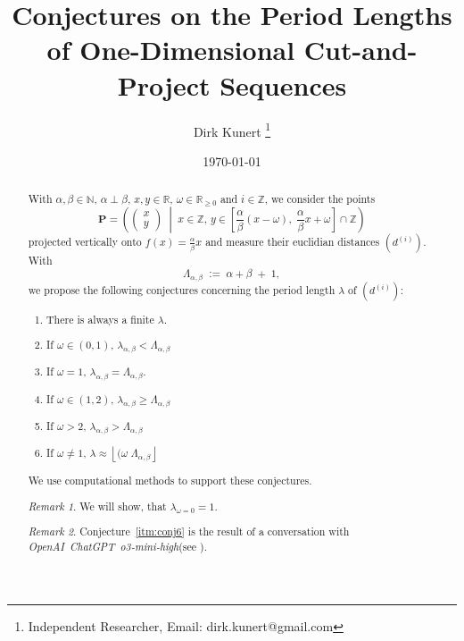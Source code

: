 \documentclass[11pt]{article}
\title{Conjectures on the Period Lengths of One-Dimensional Cut-and-Project Sequences}
\author{Dirk Kunert \thanks{Independent Researcher, Email: dirk.kunert@gmail.com}}
\date{\today}
\theoremstyle{remark}
\newtheorem{remark}{Remark}
\begin{document}
%
\newcommand{\showfigures}{true}
\newcommand{\todo}[1]{\textcolor{red}{TODO: {#1}}}
\newcommand{\langc}[0]{\mbox{C}\xspace}
\newcommand{\langp}[0]{\mbox{Python}\xspace}
\newcommand{\chat}[0]{\mbox{\emph{OpenAI ChatGPT o3-mini-high}}\xspace}
\newcommand{\function}[1]{\mbox{\texttt{#1}}\xspace}

\maketitle
%
\begin{abstract}
With $\alpha, \beta \in \mathbb{N}$, $\alpha \perp \beta$, $x, y \in \mathbb{R}$, $\omega \in \mathbb{R}_{\ge 0}$ and $i \in \mathbb{Z}$, we consider the points
%
\begin{equation}
\mathbf{P} 
= \left(
\begin{pmatrix} x \\ y \end{pmatrix}
\;\middle|\;
x \in \mathbb{Z},\,
y \in 
\left[\frac{\alpha}{\beta} (x - \omega),\; \frac{\alpha}{\beta} x + \omega\right] 
\cap \mathbb{Z}
\right)\label{eq:points}
\end{equation}
%
projected vertically onto $f(x) = \frac{\alpha}{\beta} x$ and measure their euclidian distances $\left( d^{(i)} \right)$.
%
With
\[
\Lambda_{\alpha, \beta} \;:=\; \alpha + \beta \;+\; 1,
\]
%
we propose the following conjectures concerning the period length $\lambda$ of $\left( d^{(i)} \right)$:
%
\begin{enumerate}
	\item \label{itm:conj1} There is always a finite $\lambda$.
 	\item \label{itm:conj2} If \(\omega \in (0,1)\), $\lambda_{\alpha, \beta} < \Lambda_{\alpha, \beta}$
 	\item \label{itm:conj3} If \(\omega = 1\), $\lambda_{\alpha, \beta} = \Lambda_{\alpha, \beta}$.
 	\item \label{itm:conj4} If \(\omega \in (1,2)\), $\lambda_{\alpha, \beta} \ge \Lambda_{\alpha, \beta}$
 	\item \label{itm:conj5} If \(\omega > 2\), $\lambda_{\alpha, \beta} > \Lambda_{\alpha, \beta}$
 	\item \label{itm:conj6} If \(\omega \ne 1\), $\lambda \approx \left\lfloor (\omega \; \Lambda_{\alpha, \beta} \right\rfloor$
\end{enumerate}
%
We use computational methods to support these conjectures.
%
\begin{remark}
We will show, that $\lambda_{\omega = 0} = 1$.
\end{remark}
%
\begin{remark}
Conjecture~\ref{itm:conj6} is the result of a conversation with \chat (see \cite{ChatGPT}).
\end{remark}
\end{abstract}
\end{document}

